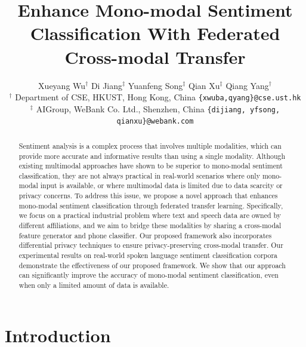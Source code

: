 \documentclass[11pt]{article}
\title{Enhance Mono-modal Sentiment Classification With Federated Cross-modal Transfer}
\author{Xueyang Wu$^{\dagger}$
\hspace{2em} Di  Jiang$^{\ddagger}$
\hspace{2em} Yuanfeng Song$^{\ddagger}$
\hspace{2em} Qian Xu$^{\ddagger}$
\hspace{2em} Qiang Yang$^{\dagger}$ \\
$^{\dagger}$ Department of CSE, HKUST, Hong Kong, China \hspace{1em}
\texttt{\small\{xwuba,qyang\}@cse.ust.hk}\\
$^{\ddagger}$ AIGroup, WeBank Co. Ltd., Shenzhen, China \hspace{1em} \texttt{\small \{dijiang, yfsong, qianxu\}@webank.com}}
\begin{document}

\maketitle

\begin{abstract}
Sentiment analysis is a complex process that involves multiple modalities, which can provide more accurate and informative results than using a single modality. Although existing multimodal approaches have shown to be superior to mono-modal sentiment classification, they are not always practical in real-world scenarios where only mono-modal input is available, or where multimodal data is limited due to data scarcity or privacy concerns. To address this issue, we propose a novel approach that enhances mono-modal sentiment classification through federated transfer learning. Specifically, we focus on a practical industrial problem where text and speech data are owned by different affiliations, and we aim to bridge these modalities by sharing a cross-modal feature generator and phone classifier. Our proposed framework also incorporates differential privacy techniques to ensure privacy-preserving cross-modal transfer. Our experimental results on real-world spoken language sentiment classification corpora demonstrate the effectiveness of our proposed framework. We show that our approach can significantly improve the accuracy of mono-modal sentiment classification, even when only a limited amount of data is available.
\end{abstract}



\section{Introduction}\label{sec:introduction}
\end{document}
